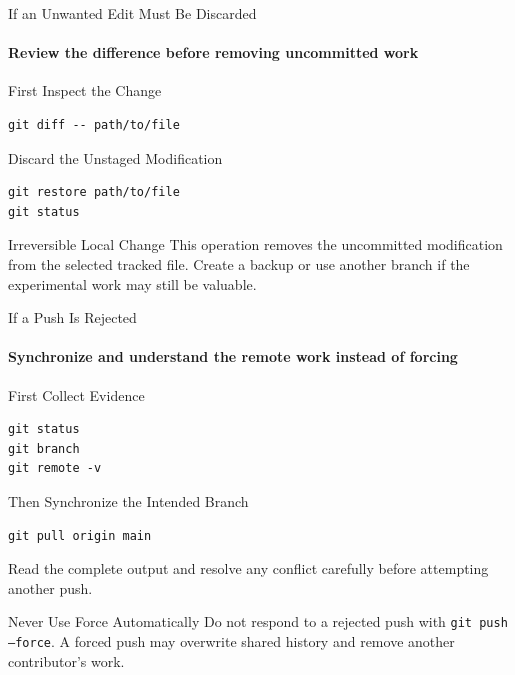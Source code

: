 \begin{frame}[fragile]{If an Unwanted Edit Must Be Discarded}
\framesubtitle{Review the difference before removing uncommitted work}

\footnotesize

\begin{block}{First Inspect the Change}
\begin{verbatim}
git diff -- path/to/file
\end{verbatim}
\end{block}

\begin{exampleblock}{Discard the Unstaged Modification}
\begin{verbatim}
git restore path/to/file
git status
\end{verbatim}
\end{exampleblock}

\begin{alertblock}{Irreversible Local Change}
This operation removes the uncommitted modification from the selected
tracked file. Create a backup or use another branch if the experimental
work may still be valuable.
\end{alertblock}

\end{frame}

\begin{frame}[fragile]{If a Push Is Rejected}
\framesubtitle{Synchronize and understand the remote work instead of forcing}

\footnotesize

\begin{block}{First Collect Evidence}
\begin{verbatim}
git status
git branch
git remote -v
\end{verbatim}
\end{block}

\begin{exampleblock}{Then Synchronize the Intended Branch}
\begin{verbatim}
git pull origin main
\end{verbatim}

Read the complete output and resolve any conflict carefully before
attempting another push.
\end{exampleblock}

\begin{alertblock}{Never Use Force Automatically}
Do not respond to a rejected push with \texttt{git push --force}.
A forced push may overwrite shared history and remove another
contributor's work.
\end{alertblock}

\end{frame}

